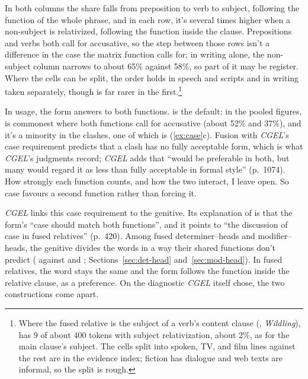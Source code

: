 In both columns the share falls from preposition to verb to subject, following the function of the whole phrase, and in each row, it's several times higher when a non-subject is relativized, following the function inside the clause. Prepositions and verbs both call for accusative, so the step between those rows isn't a difference in the case the matrix function calls for; in writing alone, the non-subject column narrows to about 65\% against 58\%, so part of it may be register. Where the cells can be split, the order holds in speech and scripts and in writing taken separately, though  is far rarer in the first.\footnote{Where the fused relative is the subject of a verb's content clause (, \textit{Wildling}),  has 9 of about 400 tokens with subject relativization, about 2\%, as for the main clause's subject. The cells split into spoken, TV, and film lines against the rest are in the evidence index; fiction has dialogue and web texts are informal, so the split is rough.}

In usage, the form answers to both functions.  is the default: in the pooled figures,  is commonest where both functions call for accusative (about 52\% and 37\%), and it's a minority in the clashes, one of which is (\ref{ex:case}c). Fusion with \textit{CGEL}'s case requirement predicts that a clash has no fully acceptable form, which is what \textit{CGEL}'s judgments record; \textit{CGEL} adds that  \enquote{would be preferable in both, but many would regard it as less than fully acceptable in formal style} (p.~1074). How strongly each function counts, and how the two interact, I leave open. So case favours a second function rather than forcing it.

\textit{CGEL} links this case requirement to the genitive. Its explanation of  is that the form's \enquote{case should match both functions}, and it points to \enquote{the discussion of case in fused relatives} (p.~420). Among fused determiner--heads and modifier--heads, the genitive divides the words in a way their shared functions don't predict ( against  and ; Sections~\ref{sec:det-head} and~\ref{sec:mod-head}). In fused relatives, the word stays the same and the form follows the function inside the relative clause, as a preference. On the diagnostic \textit{CGEL} itself chose, the two constructions come apart.

